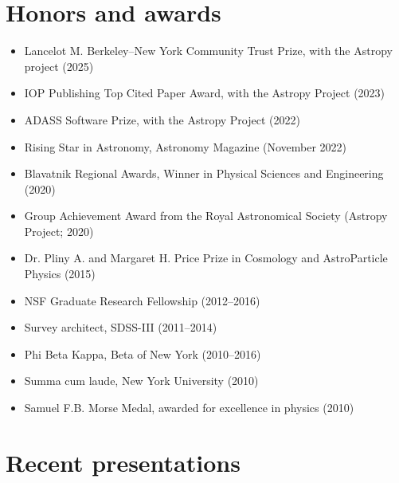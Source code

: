 \documentclass[12pt, letterpaper]{apw-cv}
\begin{document}
\section*{Honors and awards}

    \begin{itemize}
    \item Lancelot M. Berkeley--New York Community Trust Prize, with the Astropy project (2025)
    \item IOP Publishing Top Cited Paper Award, with the Astropy Project (2023)
    \item ADASS Software Prize, with the Astropy Project (2022)
    \item Rising Star in Astronomy, Astronomy Magazine (November 2022)
    \item Blavatnik Regional Awards, Winner in Physical Sciences and Engineering (2020)
    \item Group Achievement Award from the Royal Astronomical Society (Astropy Project; 2020)
    \item Dr. Pliny A. and Margaret H. Price Prize in Cosmology and AstroParticle Physics (2015)
	\item NSF Graduate Research Fellowship (2012--2016)
	\item Survey architect, SDSS-III (2011--2014)
	\item Phi Beta Kappa, Beta of New York (2010--2016)
	\item Summa cum laude, New York University (2010)
	\item Samuel F.B. Morse Medal, awarded for excellence in physics (2010)
	\end{itemize}

\section*{Recent presentations}
\end{document}
